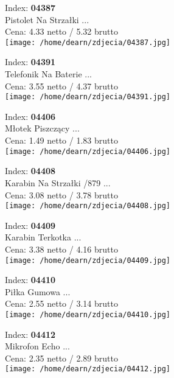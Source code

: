 {Index: \textbf{04387}\\
Pistolet Na Strzałki      ...\\
Cena: 4.33 netto / 5.32 brutto\\
  \texttt{[image: /home/dearn/zdjecia/04387.jpg]}}\newline\newline

{Index: \textbf{04391}\\
Telefonik Na Baterie      ...\\
Cena: 3.55 netto / 4.37 brutto\\
  \texttt{[image: /home/dearn/zdjecia/04391.jpg]}}\newline\newline

{Index: \textbf{04406}\\
Młotek Piszczący          ...\\
Cena: 1.49 netto / 1.83 brutto\\
  \texttt{[image: /home/dearn/zdjecia/04406.jpg]}}\newline\newline

{Index: \textbf{04408}\\
Karabin Na Strzałki  /879 ...\\
Cena: 3.08 netto / 3.78 brutto\\
  \texttt{[image: /home/dearn/zdjecia/04408.jpg]}}\newline\newline

{Index: \textbf{04409}\\
Karabin Terkotka          ...\\
Cena: 3.38 netto / 4.16 brutto\\
  \texttt{[image: /home/dearn/zdjecia/04409.jpg]}}\newline\newline

{Index: \textbf{04410}\\
Piłka Gumowa              ...\\
Cena: 2.55 netto / 3.14 brutto\\
  \texttt{[image: /home/dearn/zdjecia/04410.jpg]}}\newline\newline

{Index: \textbf{04412}\\
Mikrofon Echo             ...\\
Cena: 2.35 netto / 2.89 brutto\\
  \texttt{[image: /home/dearn/zdjecia/04412.jpg]}}\newline\newline

